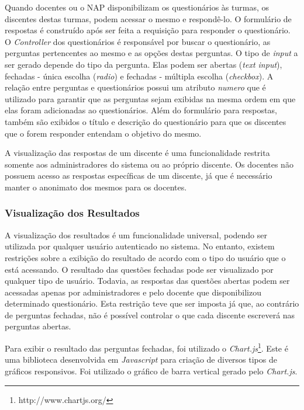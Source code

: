 \documentclass[
  12pt,       %
  openright,      %
  oneside,      %
  a4paper,      %
  english,      %
  french,        %
  spanish,     %
  brazil        %
  ]{abntex2-decsi}
\begin{document}
            Quando docentes ou o NAP disponibilizam os questionários às turmas, os discentes destas turmas, podem acessar o mesmo e respondê-lo. O formulário de respostas é construído após ser feita a requisição para responder o questionário. O \textit{Controller} dos questionários é responsável por buscar o questionário, as perguntas pertencentes ao mesmo e as opções destas perguntas. O tipo de \textit{input} a ser gerado depende do tipo da pergunta. Elas podem ser abertas (\textit{text input}), fechadas - única escolha (\textit{radio}) e fechadas - múltipla escolha (\textit{checkbox}). A relação entre perguntas e questionários possui um atributo \textit{numero} que é utilizado para garantir que as perguntas sejam exibidas na mesma ordem em que elas foram adicionadas ao questionários. Além do formulário para respostas, também são exibidos o título e descrição do questionário para que os discentes que o forem responder entendam o objetivo do mesmo. 
            
            A visualização das respostas de um discente é uma funcionalidade restrita somente aos administradores do sistema ou ao próprio discente. Os docentes não possuem acesso as respostas específicas de um discente, já que é necessário manter o anonimato dos mesmos para os docentes.

            \subsubsection{Visualização dos Resultados}

			A visualização dos resultados é um funcionalidade universal, podendo ser utilizada por qualquer usuário autenticado no sistema. No entanto, existem restrições sobre a exibição do resultado de acordo com o tipo do usuário que o está acessando. O resultado das questões fechadas pode ser visualizado por qualquer tipo de usuário. Todavia, as respostas das questões abertas podem ser acessadas apenas por administradores e pelo docente que disponibilizou determinado questionário. Esta restrição teve que ser imposta já que, ao contrário de perguntas fechadas, não é possível controlar o que cada discente escreverá nas perguntas abertas.

            Para exibir o resultado das perguntas fechadas, foi utilizado o \textit{Chart.js}\footnote{http://www.chartjs.org/}. Este é uma biblioteca desenvolvida em \textit{Javascript} para criação de diversos tipos de gráficos responsivos. Foi utilizado o gráfico de barra vertical gerado pelo \textit{Chart.js}. 
\end{document}
